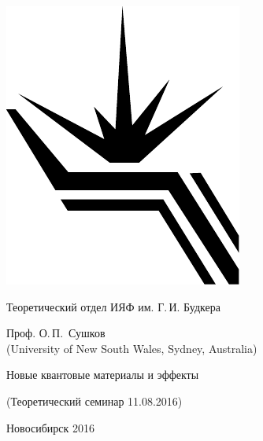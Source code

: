 \documentclass[12pt,pagesize,paper=landscape,paper=192mm:108mm]{scrbook}
\begin{document}
\begin{titlepage}
  \vspace*{-0.5em}
  \begin{center}    
    \hspace*{3em}
    \begin{minipage}[t]{3em}
      \includegraphics[width=\textwidth]{../BINP-logo}
    \end{minipage}\hfill
    Теоретический отдел ИЯФ им. Г.\,И. Будкера\hfill
    \hspace*{7em}
    \bigskip

    \large
    Проф. О.\,П.~Сушков\\  (University of New South Wales, Sydney, Australia)
    \bigskip
    \bigskip

    \huge Новые квантовые материалы и эффекты
    
    \bigskip

    \normalsize
    (Теоретический семинар 11.08.2016)
    \vfill

    \normalsize

    \normalsize \ccbysa\hspace{0.5em}  Новосибирск 2016
  \end{center}
\end{titlepage}
\end{document}
